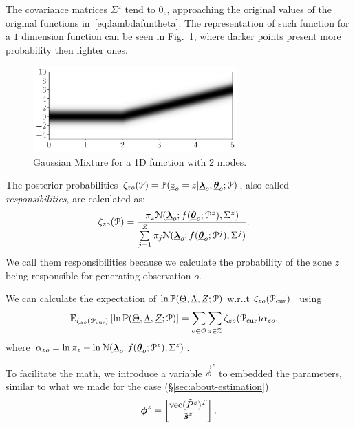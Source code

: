 \documentclass[../main.tex]{subfiles}
\begin{document}
The covariance matrices $\Sigma^{z}$ tend to $0_{c}$, approaching the original values of the original functions in~\eqref{eq:lambdafuntheta}.
The representation of such function for a $1$ dimension \pwa{} function can be seen in Fig.~\ref{fig:affine_gaussian_mixture}, where darker points present more probability then lighter ones.
\begin{figure}[h]
  \centering
  \includegraphics[width=0.7\textwidth]{../img/resilient_ineq/pwa.pdf}
  \caption{Gaussian Mixture for a 1D \pwa{} function with 2 modes.}\label{fig:affine_gaussian_mixture}
\end{figure}

The posterior probabilities $\zeta_{zo}(\mathcal{P})=\mathbb{P}(\underline{z}_{o}=z|{\underline{\boldsymbol{\lambda}}}_{o},{\underline{\boldsymbol{\theta}}}_{o};\mathcal{P})$, also called \emph{responsibilities}, are calculated as:
\begin{align}
  \label{eq:responsibilities}
\zeta_{zo}(\set{P})&=\frac{\pi_{z}{\mathcal{N}(\randomvec{\lambda}_{o};f(\randomvec{\theta}_{o};\set{P}^{z}),{\Sigma^{z}})}}{\sum\limits_{j=1}^{Z}\pi_{j}\mathcal{N}(\randomvec{\lambda}_{o};f(\randomvec{\theta}_{o};\set{P}^{j}),{\Sigma^{j}})}.
\end{align}
We call them responsibilities because we calculate the probability of the zone $z$ being responsible for generating observation $o$.

We can calculate the expectation of ${\ln\mathbb{P}(\underline{\Theta},\underline{\Lambda},\underline{Z};\mathcal{P})}$ w.r..t ${\zeta_{zo}(\mathcal{P}_{\mathrm{cur}})}$~\cite[Chapter 9]{Bishop2006} using
\begin{align}
  \label{eq:completedataLogLikelihood_expectation}
\expectation[{\zeta_{zo}(\set{P}_{\mathrm{cur}})}]{\ln\probability{\random{\Theta},\random{\Lambda},\random{Z};\set{P}}}&= \sum_{o\in\set{O}}\sum_{z\in\set{Z}}  \zeta_{zo}(\set{P}_{\mathrm{cur}})\alpha_{zo},
\end{align}
where ${\alpha_{zo}=\ln{\pi_{z}}+\ln{\mathcal{N}({\underline{\boldsymbol{\lambda}}}_{o};f({\underline{\boldsymbol{\theta}}}_{o};\mathcal{P}^{z}),{\Sigma^{z}})}}$.

To facilitate the math, we introduce a variable $\vec{\phi}^{z}$ to embedded the parameters, similar to what we made for the \RLS{} case (\S\ref{sec:about-estimation})
\begin{equation}
  \boldsymbol{\phi}^{z}=\left[
      \begin{matrix}
      \mathrm{vec} (\tilde{P}^{z})^{T}\\\tilde{\boldsymbol{s}}^{z}
      \end{matrix}
    \right].
\end{equation}
\end{document}
